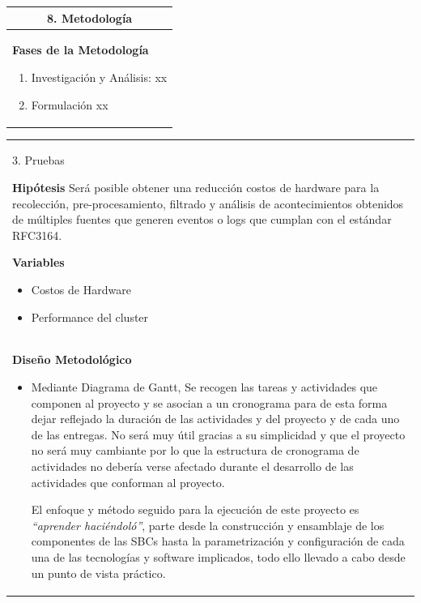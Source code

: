 \documentclass[letter,12pt]{article}
\begin{document}

\begin{center}
\begin{tabular}{|p{15.5cm}|}
\hline
\multicolumn{1}{|c|}{ \textbf{8. Metodología} }\\
\hline
\textbf{Fases de la Metodología}
    \begin{enumerate}
        \item Investigación y Análisis:
        xx
        \item Formulación
		xx
        \end{enumerate}\\
        
\hline
\end{tabular}
\end{center}

\begin{center}
\begin{tabular}{|p{15.5cm}|}
\hline    
        
        3. Pruebas
  
    \textbf{Hipótesis}
    Será posible obtener una reducción costos de hardware para la recolección, pre-procesamiento, filtrado y análisis de acontecimientos obtenidos de múltiples fuentes que generen eventos o logs que cumplan con el estándar RFC3164. 
    \par
    
    \textbf{Variables}
    \begin{itemize}
        \item Costos de Hardware
        \item Performance del cluster
    \end{itemize} \\

    
    \textbf{Diseño Metodológico}
    \begin{itemize}
        \item  Mediante Diagrama de Gantt, Se recogen las tareas y actividades que componen al
proyecto y se asocian a un cronograma para de esta forma dejar reflejado la
duración de las actividades y del proyecto y de cada uno de las entregas. No será
muy útil gracias a su simplicidad y que el proyecto no será muy cambiante por lo
que la estructura de cronograma de actividades no debería verse afectado durante
el desarrollo de las actividades que conforman al proyecto.

  El enfoque y método seguido para la ejecución de este proyecto es \textit{“aprender haciéndoló”}, parte desde la construcción y ensamblaje de los componentes de las
SBCs hasta la parametrización y configuración de cada una de las tecnologías y software implicados, todo ello llevado a cabo desde un punto de vista práctico.
        
        
    \end{itemize}\\  
        
\hline
\end{tabular}
\end{center}
\end{document}
